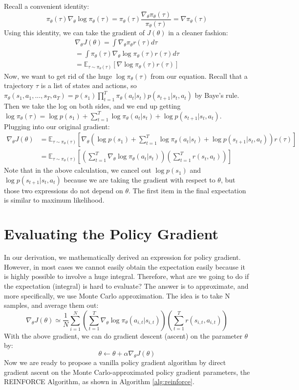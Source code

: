 Recall a convenient identity:
$$\pi_\theta(\tau)\nabla_\theta \log \pi_\theta(\tau) = \pi_\theta(\tau)\frac{\nabla_\theta \pi_\theta(\tau)}{\pi_\theta(\tau)}=\nabla \pi_\theta (\tau)$$
Using this identity, we can take the gradient of $J(\theta)$ in a cleaner fashion:
\begin{align*}
\nabla_\theta J(\theta) = \int \nabla_\theta \pi_\theta r(\tau)d\tau\\
=\int\pi_\theta(\tau)\nabla_\theta \log \pi_\theta(\tau) r(\tau) d\tau\\
= \mathbb{E}_{\tau\sim \pi_\theta(\tau)}[\nabla \log \pi_\theta (\tau)r(\tau)]
\end{align*}
Now, we want to get rid of the huge $\log \pi_\theta(\tau)$ from our equation. Recall that a trajectory $\tau$ is a list of states and actions, so $\pi_\theta(s_1,a_1,...,s_T,a_T) = p(s_1)\prod_{t=1}^T\pi_\theta (a_t|s_t)p(s_{t+1}|s_t,a_t)$ by Baye's rule. Then we take the log on both sides, and we end up getting $\log\pi_\theta(\tau) = \log p(s_1) + \sum_{t=1}^T \log\pi_\theta(a_t|s_t)+\log p(s_{t+1}|s_t,a_t)$.
Plugging into our original gradient:
\begin{equation}
\begin{aligned}
    \nabla_\theta J(\theta) &= \mathbb{E}_{\tau\sim \pi_\theta(\tau)}\left[\nabla_\theta\left(\log p(s_1) + \sum_{t=1}^T \log \pi_\theta(a_t|s_t)+\log p(s_{t+1}|s_t,a_t)\right)r(\tau)\right]\\
    &= \mathbb{E}_{\tau\sim \pi_\theta(\tau)}\left[ \left(\sum_{t=1}^T\nabla_\theta \log\pi_\theta(a_t|s_t)\right)\left(\sum_{t=1}^T r(s_t,a_t)\right)\right]
\end{aligned}
\end{equation}
Note that in the above calculation, we cancel out $\log p(s_1)$ and $\log p(s_{t+1}|s_t,a_t)$ because we are taking the gradient with respect to $\theta$, but those two expressions do not depend on $\theta$. The first item in the final expectation is similar to maximum likelihood.
\section{Evaluating the Policy Gradient}
In our derivation, we mathematically derived an expression for policy gradient. However, in most cases we cannot easily obtain the expectation easily because it is highly possible to involve a huge integral. Therefore, what are we going to do if the expectation (integral) is hard to evaluate? The answer is to approximate, and more specifically, we use Monte Carlo approximation. The idea is to take N samples, and average them out:
$$\nabla_\theta J(\theta) \simeq \frac{1}{N}\sum_{i=1}^N\left(\sum_{t=1}^T\nabla_\theta \log\pi_\theta(a_{i,t}|s_{i,t})\right)\left(\sum_{t=1}^T r(s_{i,t},a_{i,t})\right)$$
With the above gradient, we can do gradient descent (ascent) on the parameter $\theta$ by:
$$\theta \leftarrow \theta + \alpha\nabla_\theta J(\theta)$$ Now we are ready to propose a vanilla policy gradient algorithm by direct gradient ascent on the Monte Carlo-approximated policy gradient parameters, the REINFORCE Algorithm, as shown in Algorithm \ref{alg:reinforce}.


